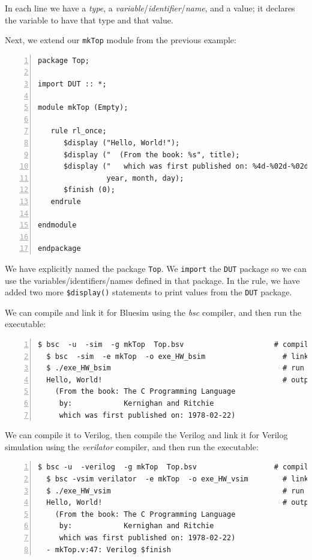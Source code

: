 In each line we have a \emph{type}, a
\emph{variable}/\emph{identifier}/\emph{name}, and a value; it
declares the variable to have that type and that value.

Next, we extend our \verb|mkTop| module from the previous example:

{\small
\begin{Verbatim}[frame=single, numbers=left, label=in file Ex\_04\_02/Top.bsv]
package Top;

import DUT :: *;

module mkTop (Empty);

   rule rl_once;
      $display ("Hello, World!");
      $display ("  (From the book: %s", title);
      $display ("   which was first published on: %4d-%02d-%02d)",
                year, month, day);
      $finish (0);
   endrule

endmodule

endpackage
\end{Verbatim}
}

We have explicitly named the package \verb|Top|.  We \verb|import| the
\verb|DUT| package so we can use the variables/identifiers/names
defined in that package.  In the rule, we have added two more
\verb|$display()| statements to print values from the \verb|DUT|
package.

We can compile and link it for Bluesim using the \emph{bsc} compiler,
and then run the executable:

{\small
\begin{Verbatim}[frame=single, numbers=left]
  $ bsc  -u  -sim  -g mkTop  Top.bsv                     # compile
  $ bsc  -sim  -e mkTop  -o exe_HW_bsim                  # link
  $ ./exe_HW_bsim                                        # run
  Hello, World!                                          # output
    (From the book: The C Programming Language
     by:            Kernighan and Ritchie
     which was first published on: 1978-02-22)
\end{Verbatim}
}

We can compile it to Verilog, then compile the Verilog and link it for
Verilog simulation using the \emph{verilator} compiler, and then run
the executable:

{\small
\begin{Verbatim}[frame=single, numbers=left]
  $ bsc -u  -verilog  -g mkTop  Top.bsv                  # compile -> mkTop.v
  $ bsc -vsim verilator  -e mkTop  -o exe_HW_vsim        # link
  $ ./exe_HW_vsim                                        # run
  Hello, World!                                          # output
    (From the book: The C Programming Language
     by:            Kernighan and Ritchie
     which was first published on: 1978-02-22)
  - mkTop.v:47: Verilog $finish
\end{Verbatim}
}

